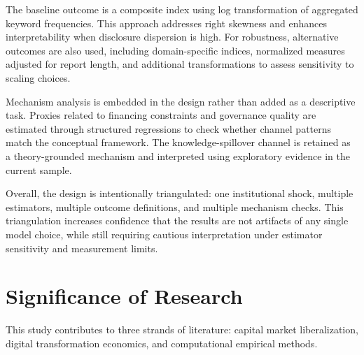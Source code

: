 The baseline outcome is a composite index using log transformation of aggregated keyword frequencies. This approach addresses right skewness and enhances interpretability when disclosure dispersion is high. For robustness, alternative outcomes are also used, including domain-specific indices, normalized measures adjusted for report length, and additional transformations to assess sensitivity to scaling choices.

Mechanism analysis is embedded in the design rather than added as a descriptive task. Proxies related to financing constraints and governance quality are estimated through structured regressions to check whether channel patterns match the conceptual framework. The knowledge-spillover channel is retained as a theory-grounded mechanism and interpreted using exploratory evidence in the current sample.

Overall, the design is intentionally triangulated: one institutional shock, multiple estimators, multiple outcome definitions, and multiple mechanism checks. This triangulation increases confidence that the results are not artifacts of any single model choice, while still requiring cautious interpretation under estimator sensitivity and measurement limits.

\section{Significance of Research}

This study contributes to three strands of literature: capital market liberalization, digital transformation economics, and computational empirical methods.

